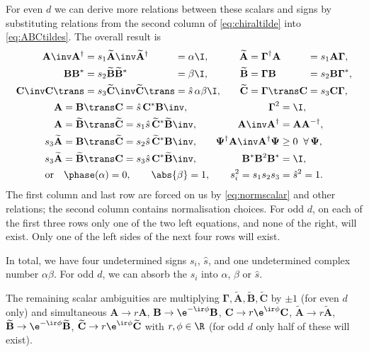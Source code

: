 \documentclass[11pt]{article}
\newcommand{\invd}{^{-\dag}}
\newcommand{\Gammab}{\boldsymbol{\Gamma}}
\newcommand{\A}{\mathbf{A}}
\newcommand{\B}{\mathbf{B}}
\renewcommand{\C}{\mathbf{C}}
\newcommand{\At}{\widetilde{\A}}
\newcommand{\Bt}{\widetilde{\B}}
\newcommand{\Ct}{\widetilde{\C}}
\newcommand{\Psib}{\boldsymbol{\Psi}}
\begin{document}
For even $d$ we can derive more relations between these scalars and signs by substituting relations from the second column of \cref{eq:chiraltilde} into \cref{eq:ABCtildes}.
The overall result is
%
\begin{equation}\label{eq:constnorm}
\begin{gathered}
\begin{alignedat}{4}
  \A\inv \A^\dag &= s_1 \At\inv \At^\dag &
        &= \alpha \I, &
    \At &= \Gammab^\dag \A &
        &= s_1 \A \Gammab,
  \\
  \B \B^\ast &= s_2 \Bt \Bt^\ast &
        &= \beta \I, &
    \Bt &= \Gammab \B &
        &= s_2 \B \Gammab^\ast,
  \\
  \C\inv \C\trans &= s_3 \Ct\inv \Ct\trans &
        &= \hat{s}\, \alpha \beta \I, &\qquad
    \Ct &= \Gammab\trans \C &
        &= s_3 \C \Gammab,
  \\
\end{alignedat}
\\
\begin{alignedat}{3}
  \A &= \B\trans \C &
        &= \hat{s}\, \C^\ast \B\inv, &\qquad
    \Gammab^2 &= \I,
  \\
  \A &= \Bt\trans \Ct &
        &= s_1 \hat{s}\, \Ct^\ast \Bt\inv, &\qquad
    \A\inv \A^\dag &= \A \A\invd,
  \\
  s_3 \At &= \B\trans \Ct &
        &= s_2 \hat{s}\, \Ct^\ast \B\inv, &\qquad
    \Psib^\dag \A\inv \A^\dag \Psib &\geq 0 \;\; \forall \, \Psib,
  \\
  s_3 \At &= \Bt\trans \C &
        &= s_3 \hat{s}\, \C^\ast \Bt\inv, &
    \B^\ast \B^2 \B^\ast &= \I,
\end{alignedat}
\\
  \text{or}\quad
  \phase(\alpha) = 0, \qquad
  \abs{\beta} = 1, \qquad
  s_i^2 = s_1 s_2 s_3 = \hat{s}^2 = 1.
\end{gathered}
\end{equation}
%
The first column and last row are forced on us by \cref{eq:normscalar} and other relations; the second column contains normalisation choices.
For odd $d$, on each of the first three rows only one of the two left equations, and none of the right, will exist.
Only one of the left sides of the next four rows will exist.

In total, we have four undetermined signs $s_i$, $\hat{s}$, and one undetermined complex number $\alpha \beta$.
For odd $d$, we can absorb the $s_i$ into $\alpha$, $\beta$ or $\hat{s}$.

The remaining scalar ambiguities are multiplying $\Gammab,\At,\Bt,\Ct$ by $\pm1$ (for even $d$ only)
and simultaneous \( \A \rightarrow r \A \),
\( \B \rightarrow \e^{-\ir\phi} \B \), \( \C \rightarrow r\e^{\ir\phi} \C \),
\( \At \rightarrow r \At \), \( \Bt \rightarrow \e^{-\ir\phi} \Bt \),
\( \Ct \rightarrow r\e^{\ir\phi} \Ct \) with \( r, \phi \in \R \) (for odd $d$ only half of these will exist).
\end{document}
